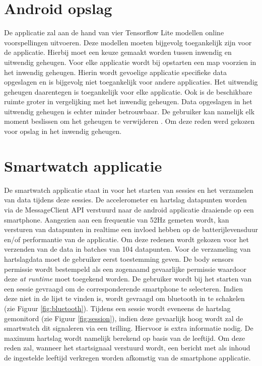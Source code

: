 \section{Android opslag}
De applicatie zal aan de hand van vier Tensorflow Lite modellen online voorspellingen uitvoeren. Deze modellen moeten bijgevolg toegankelijk zijn voor de applicatie. Hierbij moet een keuze gemaakt worden tussen inwendig en uitwendig geheugen. Voor elke applicatie wordt bij opstarten een map voorzien in het inwendig geheugen. Hierin wordt gevoelige applicatie specifieke data opgeslagen en is bijgevolg niet toegankelijk voor andere applicaties. Het uitwendig geheugen daarentegen is toegankelijk voor elke applicatie. Ook is de beschikbare ruimte groter in vergelijking met het inwendig geheugen. Data opgeslagen in het uitwendig geheugen is echter minder betrouwbaar. De gebruiker kan namelijk elk moment beslissen om het geheugen te verwijderen \cite{ref75}. Om deze reden werd gekozen voor opslag in het inwendig geheugen.

\section{Smartwatch applicatie}
De smartwatch applicatie staat in voor het starten van sessies en het verzamelen van data tijdens deze sessies. De accelerometer en hartslag datapunten worden via de MessageClient API verstuurd naar de android applicatie draaiende op een smartphone. Aangezien aan een frequentie van 52Hz gemeten wordt, kan versturen van datapunten in realtime een invloed hebben op de batterijlevensduur en/of performantie van de applicatie. Om deze redenen wordt gekozen voor het verzenden van de data in batches van 104 datapunten. Voor de verzameling van hartslagdata moet de gebruiker eerst toestemming geven. De body sensors permissie wordt bestempeld als een zogenaamd gevaarlijke permissie waardoor deze \textit{at runtime} moet toegekend worden. 
De gebruiker wordt bij het starten van een sessie gevraagd om de corresponderende smartphone te selecteren. Indien deze niet in de lijst te vinden is, wordt gevraagd om bluetooth in te schakelen (zie Figuur \ref{fig:bluetooth}).
Tijdens een sessie wordt eveneens de hartslag gemonitord (zie Figuur \ref{fig:session}), indien deze gevaarlijk hoog wordt zal de smartwatch dit signaleren via een trilling. Hiervoor is extra informatie nodig. De maximum hartslag wordt namelijk berekend op basis van de leeftijd. Om deze reden zal, wanneer het startsignaal verstuurd wordt, een bericht met als inhoud de ingestelde leeftijd verkregen worden afkomstig van de smartphone applicatie.

